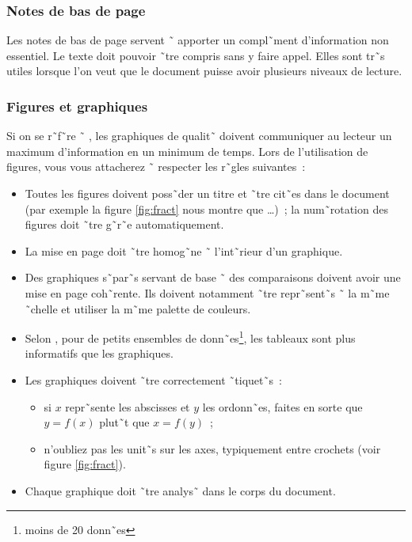 \subsubsection{Notes de bas de page}

Les notes de bas de page servent ˜ apporter un compl˜ment d'information
non essentiel. Le texte doit pouvoir ˜tre compris sans y faire appel.
Elles sont tr˜s utiles lorsque l'on veut que le document puisse avoir
plusieurs niveaux de lecture.

\subsubsection{Figures et graphiques}

Si on se r˜f˜re ˜ \cite{tufte}, les graphiques de qualit˜ doivent
communiquer au lecteur un maximum d'information en un minimum de temps. Lors
de l'utilisation de figures, vous vous attacherez ˜ respecter les r˜gles
suivantes~:
\begin{itemize}
\item Toutes les figures doivent poss˜der un titre et ˜tre cit˜es dans le
  document (par exemple \og{}la figure \ref{fig:fract} nous montre que
  \ldots{}\fg{})~; la num˜rotation des figures doit ˜tre g˜r˜e
  automatiquement.
\item La mise en page doit ˜tre homog˜ne ˜ l'int˜rieur d'un graphique.
\item Des graphiques s˜par˜s servant de base ˜ des comparaisons doivent avoir
  une mise en page coh˜rente. Ils doivent notamment ˜tre repr˜sent˜s ˜ la m˜me
  ˜chelle et utiliser la m˜me palette de couleurs.
\item Selon \cite{tufte}, pour de petits ensembles de
  donn˜es\footnote{moins de 20 donn˜es}, les 
  tableaux sont plus informatifs que les graphiques.
\item Les graphiques doivent ˜tre correctement ˜tiquet˜s~:
  \begin{itemize}
  \item si $x$ repr˜sente les abscisses et $y$ les ordonn˜es, faites en sorte
    que $y=f(x)$ plut˜t que $x=f(y)$~;
  \item n'oubliez pas les unit˜s sur les axes, typiquement entre crochets
    (voir figure \ref{fig:fract}).
  \end{itemize}
\item Chaque graphique doit ˜tre analys˜ dans le corps du document.
\end{itemize}

